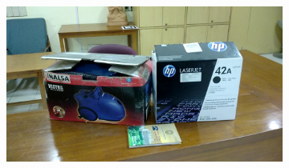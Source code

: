 \documentclass{article}
\begin{document}
\begin{enumerate}
\begin{figure}[H]
\begin{subfigure}{.33\textwidth}
					  	\caption{}
					  	\label{fig:sub2}
					\end{subfigure}
					\begin{subfigure}{.33\textwidth}
					  	\centering
					  	\includegraphics[width=1.0\linewidth]{1_3_image.jpg}
					  	

\end{subfigure}
\end{figure}
\end{enumerate}
\end{document}
